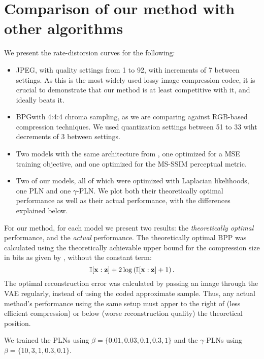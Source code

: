 \section{Comparison of our method with other algorithms}
\par

We present the rate-distorsion curves for the following:
\begin{itemize}
\item JPEG, with quality settings from 1 to 92, with increments of 7 between
  settings. As this is the most widely used lossy image compression codec, it is
  crucial to demonstrate that our method is at least competitive with it, and
  ideally beats it.
\item BPG\footnotemark with 4:4:4 chroma sampling, as we are comparing against
  RGB-based compression techniques. We used quantization settings between 51 to
  33 wiht decrements of 3 between settings.
\item Two models with the same architecture from \cite{balle2018variational},
  one optimized for a MSE training objective, and one optimized for the
  MS-SSIM perceptual metric.
\item Two of our models, all of which were optimized with Laplacian likelihoods,
  one PLN and one $\gamma$-PLN. We plot both their theoretically optimal
  performance as well as their actual performance, with the differences
  explained below.
\end{itemize}

\par
For our method, for each model we present two results: the \textit{theoretically
optimal} performance, and the \textit{actual} performance. The theoretically
optimal BPP was calculated using the theoretically achievable upper bound for
the compression size in bits as given by \cite{harsha2007communication},
without the constant term:
\[
  \mathbb{I}[\mathbf{x} : \mathbf{z}] + 2 \log \left( \mathbb{I}[\mathbf{x} : \mathbf{z}] + 1\right).
\]
The optimal reconstruction error was calculated by passing an image through the
VAE regularly, instead of using the coded approximate sample. Thus, any
actual method's performance using the same setup must apper to the right of (less
efficient compression) or below (worse reconstruction quality) the theoretical
position.


We trained the PLNs using $\beta = \{0.01, 0.03, 0.1, 0.3, 1\}$ and the
$\gamma$-PLNs using $\beta = \{10, 3, 1, 0.3, 0.1\}$.

